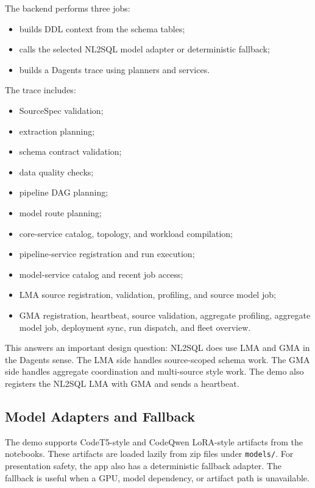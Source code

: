 \documentclass[conference]{IEEEtran}
\begin{document}
The backend performs three jobs:

\begin{itemize}
  \item builds DDL context from the schema tables;
  \item calls the selected NL2SQL model adapter or deterministic fallback;
  \item builds a Dagents trace using planners and services.
\end{itemize}

The trace includes:

\begin{itemize}
  \item SourceSpec validation;
  \item extraction planning;
  \item schema contract validation;
  \item data quality checks;
  \item pipeline DAG planning;
  \item model route planning;
  \item core-service catalog, topology, and workload compilation;
  \item pipeline-service registration and run execution;
  \item model-service catalog and recent job access;
  \item LMA source registration, validation, profiling, and source model job;
  \item GMA registration, heartbeat, source validation, aggregate profiling,
  aggregate model job, deployment sync, run dispatch, and fleet overview.
\end{itemize}

This answers an important design question: NL2SQL does use LMA and GMA in the
Dagents sense. The LMA side handles source-scoped schema work. The GMA side
handles aggregate coordination and multi-source style work. The demo also
registers the NL2SQL LMA with GMA and sends a heartbeat.

\subsection{Model Adapters and Fallback}

The demo supports CodeT5-style and CodeQwen LoRA-style artifacts from the
notebooks. These artifacts are loaded lazily from zip files under
\texttt{models/}. For presentation safety, the app also has a deterministic
fallback adapter. The fallback is useful when a GPU, model dependency, or
artifact path is unavailable.
\end{document}
